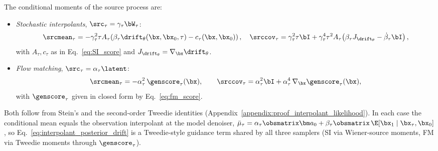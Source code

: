 \begin{lemma}\label{lem:source_moments}
The conditional moments of the source process are:
\begin{itemize}
    \item \emph{Stochastic interpolants}, $\src_\tau = \gamma_\tau\bW_\tau$:
    \begin{align}
        \srcmean_\tau = -\gamma_\tau^2\tau A_\tau\!\left(\beta_\tau\drift_\theta(\bx,\bx_0,\tau) - c_\tau(\bx,\bx_0)\right),
        \quad
        \srccov_\tau = \gamma_\tau^2\tau\bI + \gamma_\tau^4\tau^2 A_\tau\!\left(\beta_\tau J_{\drift_\theta} - \dot\beta_\tau\bI\right),
    \end{align}
    with $A_\tau, c_\tau$ as in Eq.~\eqref{eq:SI_score} and $J_{\drift_\theta}=\nabla_{\bx}\drift_\theta$.
    \item \emph{Flow matching}, $\src_\tau = \alpha_\tau\latent$:
    \begin{align}\label{eq:fm_source_moments}
        \srcmean_\tau = -\alpha_\tau^2\,\genscore_\tau(\bx),
        \qquad
        \srccov_\tau = \alpha_\tau^2\bI + \alpha_\tau^4\,\nabla_{\bx}\genscore_\tau(\bx),
    \end{align}
    with $\genscore_\tau$ given in closed form by Eq.~\eqref{eq:fm_score}.
\end{itemize}
\end{lemma}
Both follow from Stein's and the second-order Tweedie identities (Appendix~\ref{appendix:proof_interpolant_likelihood}). In each case the conditional mean equals the observation interpolant at the model denoiser, $\bar\mu_\tau = \alpha_\tau\obsmatrix\bm a_0 + \beta_\tau\obsmatrix\,\E[\bx_1\mid\bx_\tau,\bx_0]$, so Eq.~\eqref{eq:interpolant_posterior_drift} is a Tweedie-style guidance term shared by all three samplers (SI via Wiener-source moments, FM via Tweedie moments through $\genscore_\tau$).

